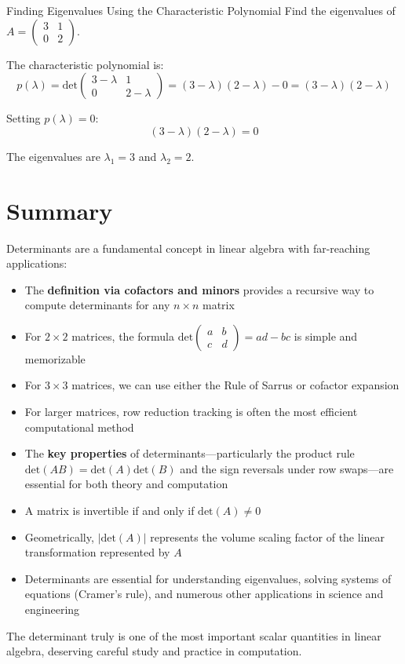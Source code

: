 \documentclass[12pt,a4paper]{article}
\newcommand{\Det}{\text{det}}
\begin{document}
	\begin{example}{Finding Eigenvalues Using the Characteristic Polynomial}
		Find the eigenvalues of $A = \begin{pmatrix} 3 & 1 \\ 0 & 2 \end{pmatrix}$.
		
		The characteristic polynomial is:
		\[
		p(\lambda) = \Det \begin{pmatrix} 3-\lambda & 1 \\ 0 & 2-\lambda \end{pmatrix} = (3-\lambda)(2-\lambda) - 0 = (3-\lambda)(2-\lambda)
		\]
		
		Setting $p(\lambda) = 0$:
		\[
		(3-\lambda)(2-\lambda) = 0
		\]
		
		The eigenvalues are $\lambda_1 = 3$ and $\lambda_2 = 2$.
	\end{example}
	
	\section{Summary}
	
	Determinants are a fundamental concept in linear algebra with far-reaching applications:
	
	\begin{itemize}
		\item The \textbf{definition via cofactors and minors} provides a recursive way to compute determinants for any $n \times n$ matrix
		
		\item For $2 \times 2$ matrices, the formula $\Det\begin{pmatrix} a & b \\ c & d \end{pmatrix} = ad - bc$ is simple and memorizable
		
		\item For $3 \times 3$ matrices, we can use either the Rule of Sarrus or cofactor expansion
		
		\item For larger matrices, row reduction tracking is often the most efficient computational method
		
		\item The \textbf{key properties} of determinants---particularly the product rule $\Det(AB) = \Det(A)\Det(B)$ and the sign reversals under row swaps---are essential for both theory and computation
		
		\item A matrix is invertible if and only if $\Det(A) \neq 0$
		
		\item Geometrically, $|\Det(A)|$ represents the volume scaling factor of the linear transformation represented by $A$
		
		\item Determinants are essential for understanding eigenvalues, solving systems of equations (Cramer's rule), and numerous other applications in science and engineering
	\end{itemize}
	
	The determinant truly is one of the most important scalar quantities in linear algebra, deserving careful study and practice in computation.
	
\end{document}
